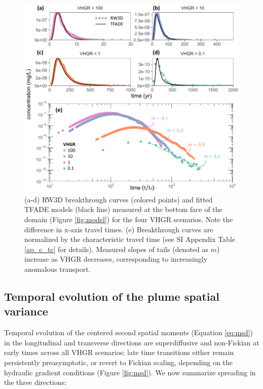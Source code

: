 \egroup



\begin{figure}[H]
	\includegraphics[width=\textwidth]{ch4_figs/tfade.pdf}
	\caption{(a-d) RW3D breakthrough curves (colored points) and fitted TFADE models (black line) measured at the bottom face of the domain (Figure \ref{fig:model}) for the four VHGR scenarios. Note the difference in x-axis travel times. (e) Breakthrough curves are normalized by the characteristic travel time (see SI Appendix Table \ref{ap_c_tc} for details). Measured slopes of tails (denoted as $m$) increase as VHGR decreases, corresponding to increasingly anomalous transport.}
	\label{fig:tfade}
\end{figure}



%
%
\subsection{Temporal evolution of the plume spatial variance}
\label{ss_3_2}

Temporal evolution of the centered second spatial moments (Equation \ref{eq:msd}) in the longitudinal and transverse directions are superdiffusive and non-Fickian at early times across all VHGR scenarios; late time transitions either remain persistently preasymptotic, or revert to Fickian scaling, depending on the hydraulic gradient conditions (Figure \ref{fig:msd}). We now summarize spreading in the three directions:


